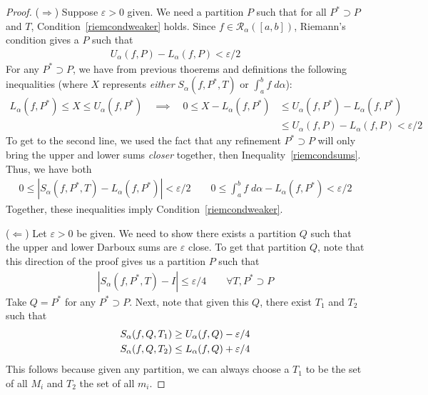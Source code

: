 \documentclass[12pt]{article}
\numberwithin{equation}{section} %
\theoremstyle{plain}
\theoremstyle{definition}
\theoremstyle{remark}
\begin{document}
\begin{proof}
($\Rightarrow$)
Suppose $\varepsilon>0$ given.
We need a partition $P$ such that for all $P^*\supset P$ and $T$,
Condition~\ref{riemcondweaker} holds.
Since $f\in\mathscr{R}_\alpha([a,b])$, Riemann's condition gives a $P$
such that
\begin{align}
  U_\alpha(f,P) - L_\alpha(f,P)<\varepsilon/2 \qquad
  \label{riemcondsums}
\end{align}
For any $P^*\supset P$, we have from previous thoerems and definitions
the following inequalities (where $X$ represents \emph{either}
$S_\alpha(f,P^*,T)$ or $\int^b_af\; d\alpha$):
\begin{align*}
  L_\alpha(f,P^*)\leq X \leq U_\alpha(f,P^*)
  \quad\implies\quad
  0\leq X-L_\alpha(f,P^*)
  &\leq U_\alpha(f,P^*)-L_\alpha(f,P^*) \\
  &\leq U_\alpha(f,P)-L_\alpha(f,P)
  < \varepsilon/2
\end{align*}
To get to the second line, we used the fact that any refinement
$P^*\supset P$ will only bring the upper and lower sums \emph{closer}
together, then Inequality~\ref{riemcondsums}.
Thus, we have both
\begin{align*}
  0\leq
  \left\lvert S_\alpha(f,P^*,T)-L_\alpha(f,P^*)\right\rvert
  <\varepsilon/2
  \qquad
  0\leq \int^b_a f\; d\alpha-L_\alpha(f,P^*) <\varepsilon/2
\end{align*}
Together, these inequalities imply Condition~\ref{riemcondweaker}.

($\Leftarrow$)
Let $\varepsilon>0$ be given. We need to show there exists a partition
$Q$ such that the upper and lower Darboux sums are $\varepsilon$ close.
To get that partition $Q$, note that this direction of the proof gives
us a partition $P$ such that
\begin{align*}
  |S_\alpha(f,P^*,T)-I|\leq \varepsilon/4
  \qquad\forall T,P^*\supset P
\end{align*}
Take $Q=P^*$ for any $P^*\supset P$.
Next, note that given this $Q$, there exist $T_1$ and $T_2$ such that
\begin{align}
    S_\alpha(f,Q,T_1) &\geq U_\alpha(f,Q) - \varepsilon/4\notag\\
    S_\alpha(f,Q,T_2) &\leq L_\alpha(f,Q) + \varepsilon/4
    \label{proof1.17}
\end{align}
This follows because given any partition, we can always choose a $T_1$
to be the set of all $M_i$ and $T_2$ the set of all $m_i$.


\end{proof}
\end{document}
